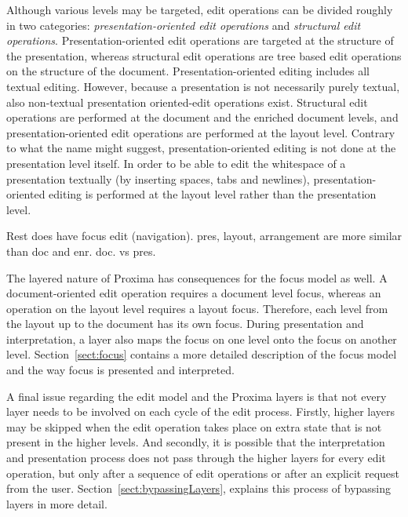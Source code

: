 \bc
Although various levels may be targeted, edit operations can be divided roughly in two categories: {\em presentation-oriented edit operations} and {\em structural edit operations}. Presentation-oriented edit operations are targeted at the structure of the presentation, whereas structural edit operations are tree based edit operations on the structure of the document.  Presentation-oriented editing includes all textual editing. However, because a presentation is not necessarily purely textual, also non-textual presentation oriented-edit operations exist. Structural edit operations are performed at the document and the enriched document levels, and presentation-oriented edit operations are performed at the layout level. Contrary to what the name might suggest, presentation-oriented editing is not done at the presentation level itself. In order to be able to edit the whitespace of a presentation textually (by inserting spaces, tabs and newlines), presentation-oriented editing is performed at the layout level rather than the presentation level. 
\ec

\bc
Rest does have focus edit (navigation). pres, layout, arrangement are more similar than doc  and enr.
doc. vs pres.
\ec

The layered nature of Proxima has consequences for the focus model as well. A document-oriented edit operation requires a document level focus, whereas an operation on the layout level requires a layout focus. Therefore, each level from the layout up to the document has its own focus. During presentation and interpretation, a layer also maps the focus on one level onto the focus on another level. Section~\ref{sect:focus} contains a more detailed description of the focus model and the way focus is presented and interpreted.

A final issue regarding the edit model and the Proxima layers is that not every layer needs to be involved on each cycle of the edit process. Firstly, higher layers may be skipped when the edit operation takes place on extra state that is not present in the higher levels. And secondly, it is possible that the interpretation and presentation process does not pass through the higher layers for every edit operation, but only after a sequence of edit operations or after an explicit request from the user. Section~\ref{sect:bypassingLayers}, explains this process of bypassing layers in more detail.


